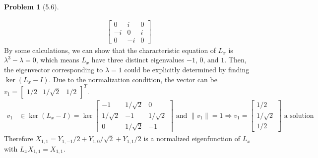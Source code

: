 \documentclass[twoside,11pt]{article}
\theoremstyle{definition}
\newtheorem{problem}{Problem}
\theoremstyle{remark}
\begin{document}
\begin{problem}[5.6]
\begin{enumerate}[label=(\alph*)]
\begin{align*}
\begin{bmatrix}
                0 & i & 0\\
                -i & 0 & i\\
                0 & -i & 0
            \end{bmatrix}
        \end{align*}
        By some calculations, we can show that the characteristic equation of
        $L_x$ is $\lambda^3 - \lambda=0$, which means $L_x$ have three distinct
        eigenvalues $-1$, $0$, and $1$.
        Then, the eigenvector corresponding to $\lambda=1$ could be explicitly determined by
        finding $\ker (L_x - I)$. Due to the normalization condition, the vector can
        be $v_1 = \begin{bmatrix} 1/2 & 1/\sqrt{2} & 1/2\end{bmatrix}^T$.
        \begin{align*}
            v_1&\in\ker (L_x-I) = \ker\begin{bmatrix}
                -1 & 1/\sqrt{2} & 0\\
                1/\sqrt{2} & -1 & 1/\sqrt{2}\\
                0 & 1/\sqrt{2} & -1
            \end{bmatrix}  \text{ and } \|v_1\| = 1
            \Rightarrow v_1 = \begin{bmatrix}
                1/2 \\ 1/\sqrt{2} \\ 1/2
            \end{bmatrix} \text{ a solution}
        \end{align*}
        Therefore $X_{1,1} = Y_{1,-1}/2 + Y_{1,0}/\sqrt{2} + Y_{1,1}/2$ is a normalized eigenfunction
        of $L_x$ with $L_x X_{1,1} = X_{1,1}$.
    \end{enumerate}
\end{problem}
\end{document}
